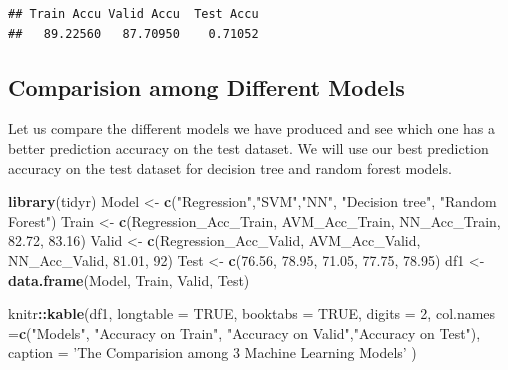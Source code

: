 \documentclass[
]{book}
\newenvironment{Shaded}{\begin{snugshade}}{\end{snugshade}}
\newcommand{\DataTypeTok}[1]{\textcolor[rgb]{0.13,0.29,0.53}{#1}}
\newcommand{\DecValTok}[1]{\textcolor[rgb]{0.00,0.00,0.81}{#1}}
\newcommand{\FloatTok}[1]{\textcolor[rgb]{0.00,0.00,0.81}{#1}}
\newcommand{\KeywordTok}[1]{\textcolor[rgb]{0.13,0.29,0.53}{\textbf{#1}}}
\newcommand{\NormalTok}[1]{#1}
\newcommand{\OperatorTok}[1]{\textcolor[rgb]{0.81,0.36,0.00}{\textbf{#1}}}
\newcommand{\OtherTok}[1]{\textcolor[rgb]{0.56,0.35,0.01}{#1}}
\newcommand{\StringTok}[1]{\textcolor[rgb]{0.31,0.60,0.02}{#1}}
\begin{document}
\begin{verbatim}
## Train Accu Valid Accu  Test Accu 
##   89.22560   87.70950    0.71052
\end{verbatim}

\hypertarget{comparision-among-different-models}{%
\subsection*{Comparision among Different Models}\label{comparision-among-different-models}}


Let us compare the different models we have produced and see which one has a better prediction accuracy on the test dataset. We will use our best prediction accuracy on the test dataset for decision tree and random forest models.

\begin{Shaded}
\begin{Highlighting}[]
\KeywordTok{library}\NormalTok{(tidyr)}
\NormalTok{Model <-}\StringTok{ }\KeywordTok{c}\NormalTok{(}\StringTok{"Regression"}\NormalTok{,}\StringTok{"SVM"}\NormalTok{,}\StringTok{"NN"}\NormalTok{, }\StringTok{"Decision tree"}\NormalTok{, }\StringTok{"Random Forest"}\NormalTok{)}
\NormalTok{Train <-}\StringTok{ }\KeywordTok{c}\NormalTok{(Regression_Acc_Train, AVM_Acc_Train, NN_Acc_Train, }\FloatTok{82.72}\NormalTok{, }\FloatTok{83.16}\NormalTok{)}
\NormalTok{Valid <-}\StringTok{ }\KeywordTok{c}\NormalTok{(Regression_Acc_Valid, AVM_Acc_Valid, NN_Acc_Valid, }\FloatTok{81.01}\NormalTok{, }\DecValTok{92}\NormalTok{)}
\NormalTok{Test <-}\StringTok{ }\KeywordTok{c}\NormalTok{(}\FloatTok{76.56}\NormalTok{, }\FloatTok{78.95}\NormalTok{, }\FloatTok{71.05}\NormalTok{, }\FloatTok{77.75}\NormalTok{, }\FloatTok{78.95}\NormalTok{)}
\NormalTok{df1 <-}\StringTok{ }\KeywordTok{data.frame}\NormalTok{(Model, Train, Valid, Test)}

\NormalTok{knitr}\OperatorTok{::}\KeywordTok{kable}\NormalTok{(df1, }\DataTypeTok{longtable =} \OtherTok{TRUE}\NormalTok{, }\DataTypeTok{booktabs =} \OtherTok{TRUE}\NormalTok{, }\DataTypeTok{digits =} \DecValTok{2}\NormalTok{, }\DataTypeTok{col.names =}\KeywordTok{c}\NormalTok{(}\StringTok{"Models"}\NormalTok{, }\StringTok{"Accuracy on Train"}\NormalTok{, }\StringTok{"Accuracy on Valid"}\NormalTok{,}\StringTok{"Accuracy on Test"}\NormalTok{), }
  \DataTypeTok{caption =} \StringTok{'The Comparision among 3 Machine Learning Models'}
\NormalTok{)}
\end{Highlighting}
\end{Shaded}
\end{document}

